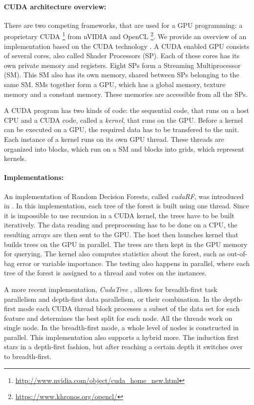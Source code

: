 \documentclass[thesis=B,english]{FITthesis}[2012/10/20]
\begin{document}
	\paragraph*{CUDA architecture overview:} There are two competing frameworks, that are used for a GPU programming: a proprietary CUDA \footnote{\url{http://www.nvidia.com/object/cuda_home_new.html}} from nVIDIA and OpenCL \footnote{\url{https://www.khronos.org/opencl/}}. We provide an overview of an implementation based on the CUDA technology \cite{grahn2011cudarf}. A CUDA enabled GPU consists of several cores, also called Shader Processors (SP). Each of these cores has its own private memory and registers. Eight SPs form a Streaming Multiprocessor (SM). This SM also has its own memory, shared between SPs belonging to the same SM. SMs together form a GPU, which has a global memory, texture memory and a constant memory. These memories are accessible from all the SPs. 

	A CUDA program has two kinds of code: the sequential code, that runs on a host CPU and a CUDA code, called a \emph{kernel}, that runs on the GPU. Before a kernel can be executed on a GPU, the required data has to be transfered to the unit. Each instance of a kernel runs on its own GPU thread. These threads are organized into blocks, which run on a SM and blocks into grids, which represent kernels.

	\paragraph*{Implementations:} An implementation of Random Decision Forests, called \textit{cudaRF}, was introduced in \cite{grahn2011cudarf}. In this implementation, each tree of the forest is built using one thread. Since it is impossible to use recursion in a CUDA kernel, the trees have to be built iteratively. The data reading and preprocessing has to be done on a CPU, the resulting arrays are then sent to the GPU. The host then launches kernel that builds trees on the GPU in parallel. The trees are then kept in the GPU memory for querying. The kernel also computes statistics about the forest, such as out-of-bag error or variable importance. The testing also happens in parallel, where each tree of the forest is assigned to a thread and votes on the instances.

	A more recent implementation, \textit{CudaTree} \cite{liao2013learning}, allows for breadth-first task parallelism and depth-first data parallelism, or their combination. In the depth-first mode each CUDA thread block processes a subset of the data set for each feature and determines the best split for each node. All the threads work on single node. In the breadth-first mode, a whole level of nodes is constructed in parallel. This implementation also supports a hybrid more. The induction first stars in a depth-first fashion, but after reaching a certain depth it switches over to breadth-first. 
\end{document}
